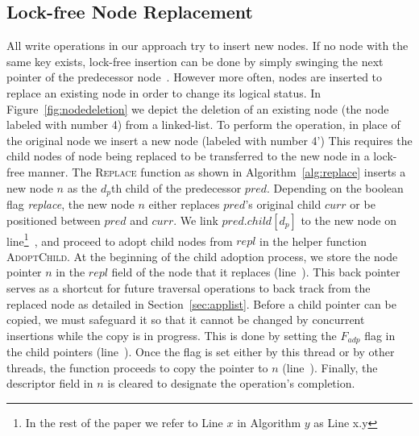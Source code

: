 \documentclass[10pt,conference,compsocconf]{IEEEtran}
\begin{document}
\subsection{Lock-free Node Replacement}
\label{sec:noderepl}
All write operations in our approach try to insert new nodes.
If no node with the same key exists, lock-free insertion can be done by simply swinging the next pointer of the predecessor node~\cite{zhang2015lockfree,harris2001pragmatic}. However more often, nodes are inserted to replace an existing node in order to change its logical status.
In Figure~\ref{fig:nodedeletion} we depict the deletion of an existing node (the node labeled with number 4) from a linked-list. 
To perform the operation, in place of the original node we insert a new node (labeled with number 4')
This requires the child nodes of node being replaced to be transferred to the new node in a lock-free manner.
The \textsc{Replace} function as shown in Algorithm~\ref{alg:replace} inserts a new node $n$ as the $d_p$th child of the predecessor $pred$.
Depending on the boolean flag \textit{replace}, the new node $n$ either replaces $pred$'s original child $curr$ or be positioned between $pred$ and $curr$.
We link $pred.child[d_p]$ to the new node on line\footnote{In the rest of the paper we refer to Line $x$ in Algorithm $y$ as Line x.y}~, and proceed to adopt child nodes from $repl$ in the helper function \textsc{AdoptChild}.
At the beginning of the child adoption process, we store the node pointer $n$ in the $repl$ field of the node that it replaces (line~).
This back pointer serves as a shortcut for future traversal operations to back track from the replaced node as detailed in Section~\ref{sec:applist}.
Before a child pointer can be copied, we must safeguard it so that it cannot be changed by concurrent insertions while the copy is in progress.
This is done by setting the $F_{adp}$ flag in the child pointers (line~).
Once the flag is set either by this thread or by other threads, the function proceeds to copy the pointer to $n$ (line~). 
Finally, the descriptor field in $n$ is cleared to designate the operation's completion.
\end{document}
